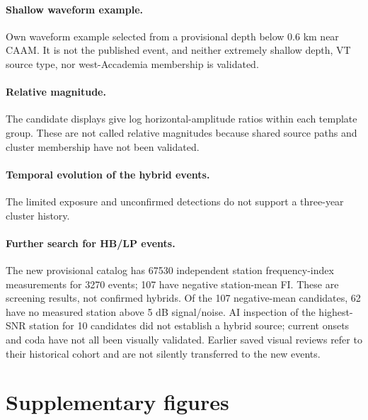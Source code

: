 \paragraph{Shallow waveform example.} Own waveform example selected from a provisional depth below 0.6 km near CAAM. It is not the published event, and neither extremely shallow depth, VT source type, nor west-Accademia membership is validated.
\paragraph{Relative magnitude.} The candidate displays give log horizontal-amplitude ratios within each template group. These are not called relative magnitudes because shared source paths and cluster membership have not been validated.
\paragraph{Temporal evolution of the hybrid events.} The limited exposure and unconfirmed detections do not support a three-year cluster history.
\paragraph{Further search for HB/LP events.} The new provisional catalog has 67530 independent station frequency-index measurements for 3270 events; 107 have negative station-mean FI. These are screening results, not confirmed hybrids. Of the 107 negative-mean candidates, 62 have no measured station above 5 dB signal/noise. AI inspection of the highest-SNR station for 10 candidates did not establish a hybrid source; current onsets and coda have not all been visually validated. Earlier saved visual reviews refer to their historical cohort and are not silently transferred to the new events.

\clearpage
\section*{Supplementary figures}
















